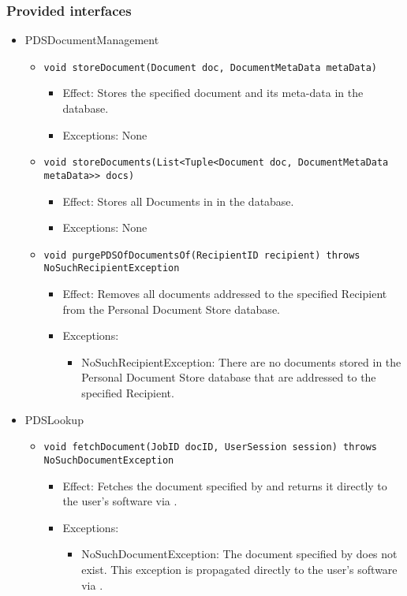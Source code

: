 \subsubsection*{Provided interfaces}
\begin{itemize}
	\item PDSDocumentManagement
	\begin{itemize}
		\item \texttt{void storeDocument(Document doc, DocumentMetaData metaData)}
		\begin{itemize}
			\item Effect: Stores the specified document and its meta-data in the database.
			\item Exceptions: None
		\end{itemize}

		\item \texttt{void storeDocuments(List<Tuple<Document doc, DocumentMetaData metaData>> docs)}
		\begin{itemize}
			\item Effect: Stores all Documents in  in the database.
			\item Exceptions: None
		\end{itemize}

		\item \texttt{void purgePDSOfDocumentsOf(RecipientID recipient) throws NoSuchRecipientException}
		\begin{itemize}
			\item Effect: Removes all documents addressed to the specified Recipient from the Personal Document Store database.
			\item Exceptions:
			\begin{itemize}
				\item NoSuchRecipientException: There are no documents stored in the Personal Document Store database that are addressed to the specified Recipient.
			\end{itemize}
		\end{itemize}
	\end{itemize}

    \item PDSLookup
	\begin{itemize}
		\item \texttt{void fetchDocument(JobID docID, UserSession session) throws NoSuchDocumentException}
		\begin{itemize}
			\item Effect: Fetches the document specified by  and returns it directly to the user's software via .
			\item Exceptions:
			\begin{itemize}
				\item NoSuchDocumentException: The document specified by  does not exist. This exception is propagated directly to the user's software via .
			\end{itemize}
		\end{itemize}
				

\end{itemize}
\end{itemize}
